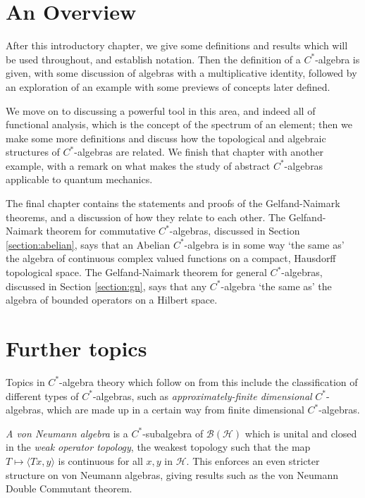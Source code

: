 \documentclass[11pt,a4paper]{report}
\theoremstyle{plain}
\theoremstyle{definition}
\newcommand{\1}{\mathbbm{1}}
\renewcommand{\H}{\mathcal{H}}
\newcommand{\B}{\mathcal{B}}
\newcommand{\BH}{\mathcal{\B(\H)}}
\begin{document}
\section{An Overview}

After this introductory chapter, we give some definitions and results which will 
be used throughout, and establish notation. Then the definition of a 
$C^\ast$-algebra is given, with some discussion of algebras with a 
multiplicative identity, followed by an exploration of an example with some 
previews of concepts later defined. 

We move on to discussing a powerful tool in 
this area, and indeed all of functional analysis, which is the concept of the 
spectrum of an element; then we make some more definitions and discuss how the 
topological and algebraic structures of $C^\ast$-algebras are related. 
We finish that chapter with another example, with a remark on what makes the 
study of abstract $C^\ast$-algebras applicable to quantum mechanics. 

The final chapter contains the statements and proofs of the Gelfand-Naimark theorems, and a discussion of how they relate to each other. The Gelfand-Naimark theorem for commutative $C^\ast$-algebras, discussed in Section \ref{section:abelian}, says that an Abelian $C^\ast$-algebra is in some way `the same as' the algebra of continuous complex valued functions on a compact, Hausdorff topological space. The Gelfand-Naimark theorem for general $C^\ast$-algebras, discussed in Section \ref{section:gn}, says that any $C^\ast$-algebra `the same as' the algebra of bounded operators on a Hilbert space.




\section{Further topics}
Topics in $C^\ast$-algebra theory which follow on from this include the classification of different 
types of $C^\ast$-algebras, such as \emph{approximately-finite dimensional} $C^\ast$-algebras, which are 
made up in a certain way from finite dimensional $C^\ast$-algebras.

\emph{A von Neumann algebra }is a $C^\ast$-subalgebra of $\BH$ which is unital 
and closed in the \emph{weak operator topology}, the weakest topology such that 
the map $T\mapsto\langle Tx,y\rangle$ is continuous for all $x,y$ in $\H$. This 
enforces an even stricter structure on von Neumann algebras, giving results such 
as the von Neumann Double Commutant theorem.
\end{document}
